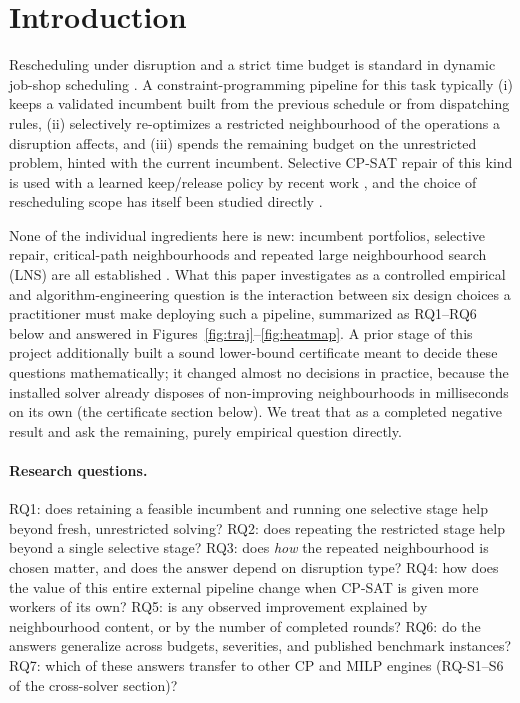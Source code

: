 \documentclass[letterpaper]{article} %
\begin{document}
\section{Introduction}

Rescheduling under disruption and a strict time budget is standard in dynamic job-shop scheduling \citep{vieira2003,ouelhadj2009}. A constraint-programming pipeline for this task typically (i) keeps a validated incumbent built from the previous schedule or from dispatching rules, (ii) selectively re-optimizes a restricted neighbourhood of the operations a disruption affects, and (iii) spends the remaining budget on the unrestricted problem, hinted with the current incumbent. Selective CP-SAT repair of this kind is used with a learned keep/release policy by recent work \citep{linyang2026}, and the choice of rescheduling scope has itself been studied directly \citep{sun2026}.

None of the individual ingredients here is new: incumbent portfolios, selective repair, critical-path neighbourhoods and repeated large neighbourhood search (LNS) are all established \citep{balas1969,vanlaarhoven1992,nowicki1996,shaw1998,godard2005,gomes2001}. What this paper investigates as a controlled empirical and algorithm-engineering question is the interaction between six design choices a practitioner must make deploying such a pipeline, summarized as RQ1--RQ6 below and answered in Figures~\ref{fig:traj}--\ref{fig:heatmap}. A prior stage of this project additionally built a sound lower-bound certificate meant to decide these questions mathematically; it changed almost no decisions in practice, because the installed solver already disposes of non-improving neighbourhoods in milliseconds on its own (the certificate section below). We treat that as a completed negative result and ask the remaining, purely empirical question directly.

\paragraph{Research questions.} RQ1: does retaining a feasible incumbent and running one selective stage help beyond fresh, unrestricted solving? RQ2: does repeating the restricted stage help beyond a single selective stage? RQ3: does \emph{how} the repeated neighbourhood is chosen matter, and does the answer depend on disruption type? RQ4: how does the value of this entire external pipeline change when CP-SAT is given more workers of its own? RQ5: is any observed improvement explained by neighbourhood content, or by the number of completed rounds? RQ6: do the answers generalize across budgets, severities, and published benchmark instances? RQ7: which of these answers transfer to other CP and MILP engines (RQ-S1--S6 of the cross-solver section)?
\end{document}
